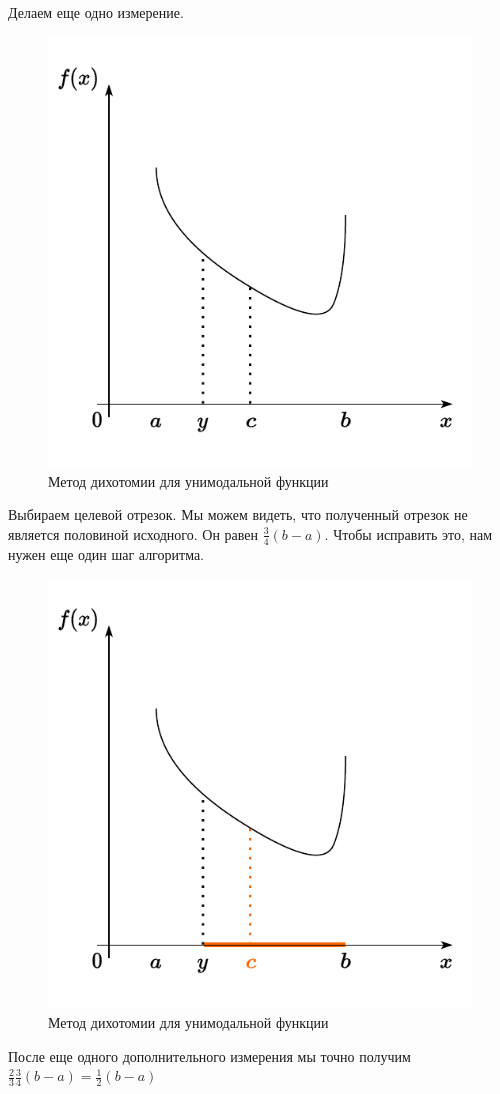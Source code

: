 \documentclass[
  russian,
  letterpaper,
  DIV=11,
  numbers=noendperiod]{scrartcl}
\begin{document}
Делаем еще одно измерение.

\begin{figure}[H]

{\centering \includegraphics[width=0.4\linewidth,height=\textheight,keepaspectratio]{Dichotomy7.pdf}

}

\caption{Метод дихотомии для унимодальной функции}

\end{figure}%

Выбираем целевой отрезок. Мы можем видеть, что полученный отрезок не
является половиной исходного. Он равен \(\frac{3}{4} (b-a)\). Чтобы
исправить это, нам нужен еще один шаг алгоритма.

\begin{figure}[H]

{\centering \includegraphics[width=0.4\linewidth,height=\textheight,keepaspectratio]{Dichotomy8.pdf}

}

\caption{Метод дихотомии для унимодальной функции}

\end{figure}%

После еще одного дополнительного измерения мы точно получим
\(\frac{2}{3} \frac{3}{4}(b-a) = \frac{1}{2}(b-a)\)
\end{document}
